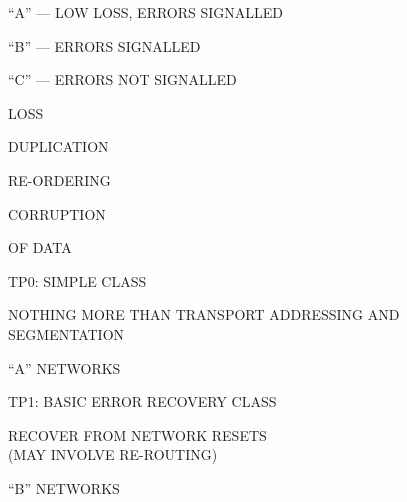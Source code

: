 \begin{bwslide}

\begin{nrtc}
\item	``A'' --- LOW LOSS, ERRORS SIGNALLED

\item	``B'' --- ERRORS SIGNALLED

\item	``C'' --- ERRORS NOT SIGNALLED
    \begin{nrtc}
    \item	LOSS

    \item	DUPLICATION

    \item	RE-ORDERING

    \item	CORRUPTION
    \end{nrtc}
    OF DATA
\end{nrtc}
\end{bwslide}


\begin{bwslide}

\begin{nrtc}
\item	TP0: SIMPLE CLASS
    \begin{nrtc}
    \item	NOTHING MORE THAN TRANSPORT ADDRESSING AND SEGMENTATION

    \item	``A'' NETWORKS
    \end{nrtc}

\item	TP1: BASIC ERROR RECOVERY CLASS
    \begin{nrtc}
    \item	RECOVER FROM NETWORK RESETS\\ (MAY INVOLVE RE-ROUTING)

    \item	``B'' NETWORKS
    \end{nrtc}
\end{nrtc}
\end{bwslide}


